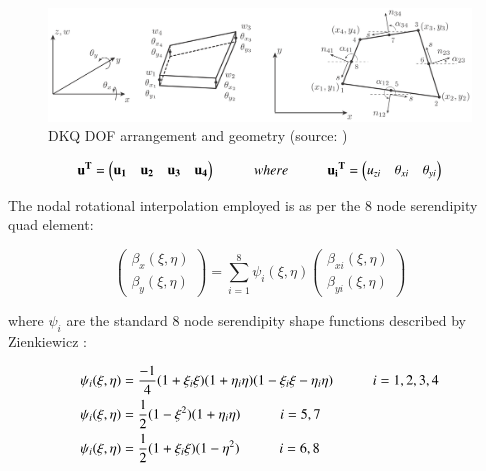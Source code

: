 \begin{figure}[H]
	\centering
	\def\svgwidth{\columnwidth}
	\includegraphics[width=15cm]{images/8nodeseren.png}
	\caption{DKQ DOF arrangement and geometry (source: \cite{Bar12})}
	\label{8nodeseren}
\end{figure}

\begin{equation} 
\mathbf{u^T} = 
\begin{pmatrix}
\mathbf{u_1} & \mathbf{u_2} & \mathbf{u_3} & \mathbf{u_4}
\end{pmatrix} 
\hspace{10mm}
where
\hspace{10mm}
\mathbf{u{_i}^T} = 
\begin{pmatrix}
{u_{zi}} & {\theta_{xi}} & {\theta_{yi}}
\end{pmatrix}
\label{equationBending}
\end{equation}

The nodal rotational interpolation employed is as per the 8 node serendipity quad element:

\begin{equation} 
\begin{pmatrix}
\beta_x (\xi , \eta) \\
\beta_y (\xi , \eta)
\end{pmatrix}
= \sum_{i=1}^8 \psi_i (\xi , \eta) 
\begin{pmatrix}
\beta_{xi} (\xi , \eta) \\
\beta_{yi} (\xi , \eta)
\end{pmatrix}
\label{equation20}
\end{equation}

where $\psi_i$ are the standard 8 node serendipity shape functions described by Zienkiewicz \cite{Zie77}:


\begin{gather} 
	\begin{aligned}
		&\psi_i (\xi , \eta) = \frac{-1}{4} (1 + \xi_i \xi)(1 + \eta_i \eta)(1 - \xi_i \xi - \eta_i \eta)
		\hspace{10mm}
		i = 1, 2, 3, 4 \\
		&\psi_i (\xi , \eta) = \frac{1}{2} (1 - \xi^2)(1 + \eta_i \eta)
		\hspace{10mm}
		i = 5, 7 \\
		&\psi_i (\xi , \eta) = \frac{1}{2} (1 + \xi_i \xi)(1 - \eta^2)
		\hspace{10mm}
		i = 6, 8
		\label{equation21}
	\end{aligned}
\end{gather}

